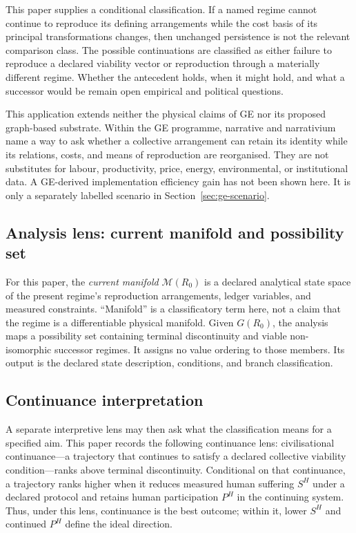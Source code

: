 \documentclass[11pt]{article}
\begin{document}
This paper supplies a conditional classification. If a named regime cannot
continue to reproduce its defining arrangements while the cost basis of its
principal transformations changes, then unchanged persistence is not the
relevant comparison class. The possible continuations are classified as either
failure to reproduce a declared viability vector or reproduction through a
materially different regime. Whether the antecedent holds, when it might hold,
and what a successor would be remain open empirical and political questions.

This application extends neither the physical claims of GE nor its proposed
graph-based substrate. Within the GE programme, narrative and narrativium name
a way to ask whether a collective arrangement can retain its identity while its
relations, costs, and means of reproduction are reorganised. They are not
substitutes for labour, productivity, price, energy, environmental, or
institutional data. A GE-derived implementation efficiency gain has not been
shown here. It is only a separately labelled scenario in
Section~\ref{sec:ge-scenario}.

\subsection{Analysis lens: current manifold and possibility set}

For this paper, the \emph{current manifold} $\mathcal{M}(R_0)$ is a declared
analytical state space of the present regime's reproduction arrangements,
ledger variables, and measured constraints. ``Manifold'' is a classificatory
term here, not a claim that the regime is a differentiable physical manifold.
Given $G(R_0)$, the analysis maps a possibility set containing terminal
discontinuity and viable non-isomorphic successor regimes. It assigns no value
ordering to those members. Its output is the declared state description,
conditions, and branch classification.

\subsection{Continuance interpretation}

A separate interpretive lens may then ask what the classification means for a
specified aim. This paper records the following continuance lens: civilisational
continuance---a trajectory that continues to satisfy a declared collective
viability condition---ranks above terminal discontinuity. Conditional on that
continuance, a trajectory ranks higher when it reduces measured human suffering
$S^{H}$ under a declared protocol and retains human participation $P^{H}$ in
the continuing system. Thus, under this lens, continuance is the best outcome;
within it, lower $S^{H}$ and continued $P^{H}$ define the ideal direction.
\end{document}
